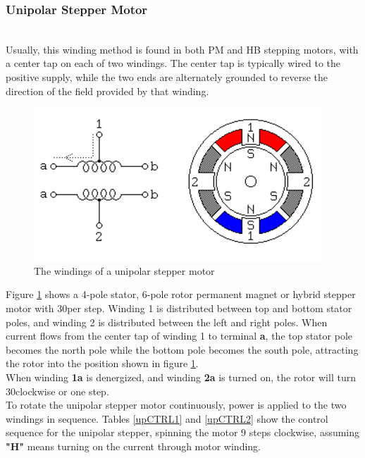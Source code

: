 \documentclass[journal]{IEEEtran}
\begin{document}
\subsubsection{Unipolar Stepper Motor}\hfill\\
Usually, this winding method is found in both PM and HB stepping motors, with a center tap on each of two windings. The center tap is typically wired to the positive supply, while the two ends are alternately grounded to reverse the direction of the field provided by that winding.\\

\begin{figure}[h]
    \centering
    \includegraphics[scale=0.63]{Stepper/uPStep.png}
    \caption{The windings of a unipolar stepper motor}
    \label{upS}
\end{figure}
Figure \ref{upS} shows a 4-pole stator, 6-pole rotor permanent magnet or hybrid stepper motor with 30\textdegree per step. Winding 1 is distributed between top and bottom stator poles, and winding 2 is distributed between the left and right poles. When current flows from the center tap of winding 1 to terminal \textbf{a}, the top stator pole becomes the north pole while the bottom pole becomes the south pole, attracting the rotor into the position shown in figure \ref{upS}.\\
When winding \textbf{1a} is denergized, and winding \textbf{2a} is turned on, the rotor will turn 30\textdegree clockwise or one step.\\

To rotate the unipolar stepper motor continuously, power is applied to the two windings in sequence.  Tables \ref{upCTRL1} and \ref{upCTRL2} show the control sequence for the unipolar stepper, spinning the motor 9 steps clockwise, assuming \textbf{"H"} means turning on the current through motor winding.
\end{document}
